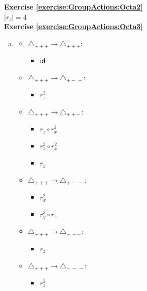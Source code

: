 \noindent\textbf{Exercise \ref{exercise:GroupActions:Octa2}}
\\
$|r_z|=4$
\\

\noindent\textbf{Exercise \ref{exercise:GroupActions:Octa3}}
\begin{enumerate}[(a)]
\item
	\begin{multicols}{2}
	\begin{itemize}
	\item
	$\triangle_{ +++} \rightarrow \triangle_{ +++}:$
		\begin{itemize}
		\item
		$\sf{id}$
		\end{itemize}
		
	\item
	$\triangle_{ +++} \rightarrow \triangle_{ +-\,+}: $
		\begin{itemize}
		\item
		$r_z^3$
		\end{itemize}
	
	\item
	$\triangle_{ +++} \rightarrow \triangle_{ ++-\,}:$
		\begin{itemize}
		\item
		$r_z \circ r_x^2$
		
		\item
		$r_z^3 \circ r_x^2$
		
		\item
		$r_y$
		\end{itemize}
	
	\item
	$\triangle_{ +++} \rightarrow \triangle_{ +-\,-\,}: $
		\begin{itemize}
		\item
		$r_x^2$
		
		\item
		$r_y^3 \circ r_z$
		\end{itemize}
		
	\item
	$\triangle_{ +++} \rightarrow \triangle_{-\,++}:$ 
		\begin{itemize}
		\item
		$r_z $
		\end{itemize}
		
	\item
	$\triangle_{ +++} \rightarrow \triangle_{-\,-\,+}:$ 
		\begin{itemize}
		\item
		$r_z^2$
		\end{itemize}
		

\end{itemize}
\end{multicols}
\end{enumerate}
